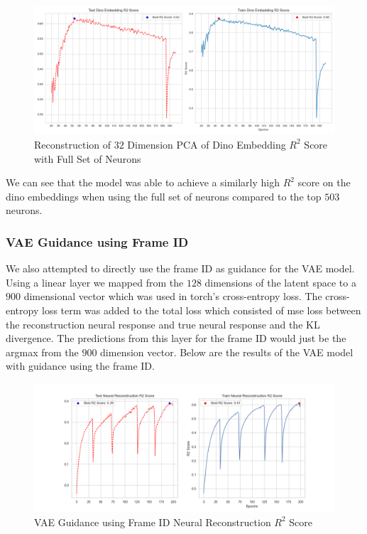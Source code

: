 \documentclass[12pt, letterpaper]{article}
\begin{document}
\begin{figure}[H]
    \centering
    \includegraphics[width=.9\textwidth]{.9_pca_dino_embed_r2_128dim_772_top_var_200_epochs_0.008_beta_2_layer.png}
    \caption{Reconstruction of $32$ Dimension PCA of Dino Embedding $R^2$ Score with Full Set of Neurons}
    \label{fig:vae_guidance_dino_pca_dino_embed_r2_full_neurons}
\end{figure}

We can see that the model was able to achieve a similarly high $R^2$ score on the dino embeddings when using the full set of neurons compared to the top $503$ neurons. 

\subsubsection{VAE Guidance using Frame ID}
\label{subsubsec:vae_guidance_frame_id}
We also attempted to directly use the frame ID as guidance for the VAE model. Using a linear layer we mapped from the $128$ dimensions of the latent space to a $900$ dimensional vector which was used in torch's cross-entropy loss. The cross-entropy loss term was added to the total loss which consisted of mse loss between the reconstruction neural response and true neural response and the KL divergence. The predictions from this layer for the frame ID would just be the argmax from the $900$ dimension vector. Below are the results of the VAE model with guidance using the frame ID.

\begin{figure}[H]
    \centering
    \includegraphics[width=1.0\textwidth]{x_r2_128dim_503_top_var_200_epochs_0.05_beta_2_layer_frame_id_guidance.png}
    \caption{VAE Guidance using Frame ID Neural Reconstruction $R^2$ Score}
    \label{fig:vae_guidance_frame_id}
\end{figure}
\end{document}
